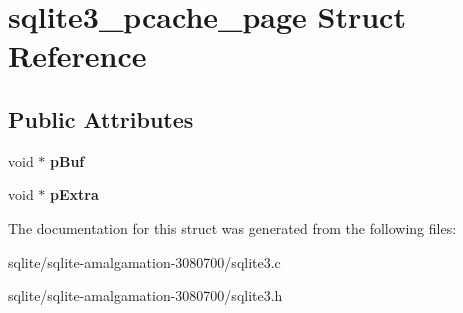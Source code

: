 \hypertarget{structsqlite3__pcache__page}{\section{sqlite3\+\_\+pcache\+\_\+page Struct Reference}
\label{structsqlite3__pcache__page}
}
\subsection*{Public Attributes}
\begin{DoxyCompactItemize}
\item 
\hypertarget{structsqlite3__pcache__page_aa5446325077c05e4b242c8e2d0faba3b}{void $\ast$ {\bfseries p\+Buf}}\label{structsqlite3__pcache__page_aa5446325077c05e4b242c8e2d0faba3b}

\item 
\hypertarget{structsqlite3__pcache__page_a96d7b0314d02837dd6a5e7057912f74f}{void $\ast$ {\bfseries p\+Extra}}\label{structsqlite3__pcache__page_a96d7b0314d02837dd6a5e7057912f74f}

\end{DoxyCompactItemize}


The documentation for this struct was generated from the following files\+:\begin{DoxyCompactItemize}
\item 
sqlite/sqlite-\/amalgamation-\/3080700/sqlite3.\+c\item 
sqlite/sqlite-\/amalgamation-\/3080700/sqlite3.\+h\end{DoxyCompactItemize}
